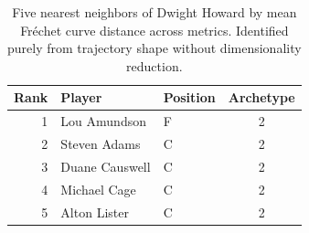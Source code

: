 \begin{table}[htbp]
  \centering\small
  \begin{tabular}{rllc}
    \toprule
    Rank & Player & Position & Archetype \\
    \midrule
    1 & Lou Amundson & F & 2 \\
    2 & Steven Adams & C & 2 \\
    3 & Duane Causwell & C & 2 \\
    4 & Michael Cage & C & 2 \\
    5 & Alton Lister & C & 2 \\
    \bottomrule
  \end{tabular}
  \caption{Five nearest neighbors of Dwight Howard by mean Fr\'{e}chet curve distance across metrics. Identified purely from trajectory shape without dimensionality reduction.}
  \label{tab:Dwight_Howard_frechet_curve_neighbors}
\end{table}

